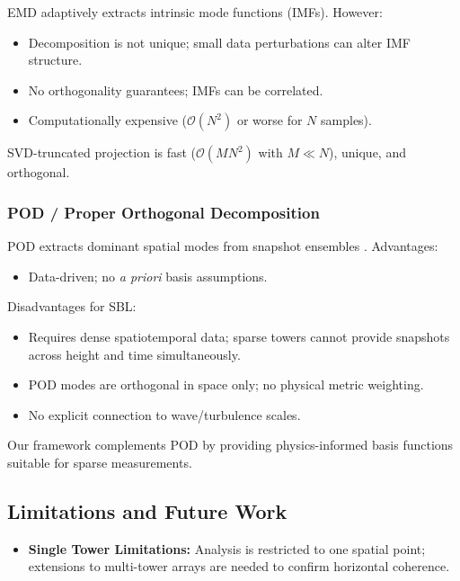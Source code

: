 \documentclass[11pt,a4paper]{article}
\begin{document}
EMD \citep{Huang2009} adaptively extracts intrinsic mode functions (IMFs). However:
\begin{itemize}
  \item Decomposition is not unique; small data perturbations can alter IMF structure.
  \item No orthogonality guarantees; IMFs can be correlated.
  \item Computationally expensive ($\mathcal{O}(N^2)$ or worse for $N$ samples).
\end{itemize}
SVD-truncated projection is fast ($\mathcal{O}(MN^2)$ with $M \ll N$), unique, and orthogonal.

\subsubsection{POD / Proper Orthogonal Decomposition}

POD extracts dominant spatial modes from snapshot ensembles \citep{Schmid2010}. Advantages:
\begin{itemize}
  \item Data-driven; no \emph{a priori} basis assumptions.
\end{itemize}
Disadvantages for SBL:
\begin{itemize}
  \item Requires dense spatiotemporal data; sparse towers cannot provide snapshots across height and time simultaneously.
  \item POD modes are orthogonal in space only; no physical metric weighting.
  \item No explicit connection to wave/turbulence scales.
\end{itemize}
Our framework complements POD by providing physics-informed basis functions suitable for sparse measurements.

\subsection{Limitations and Future Work}
\begin{itemize}
  \item \textbf{Single Tower Limitations:} Analysis is restricted to one spatial point; extensions to multi-tower arrays are needed to confirm horizontal coherence. %
\end{itemize}
\end{document}
